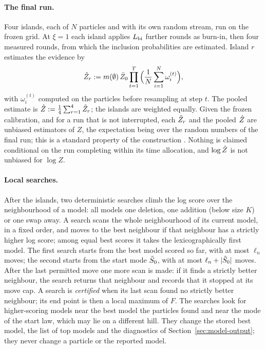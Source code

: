 \paragraph{The final run.} Four islands, each of $N$ particles and with its own random stream, run on the frozen
grid. At $\xi=1$ each island applies $L_{\mathrm{bi}}$ further rounds as burn-in, then four measured rounds, from which the
inclusion probabilities are estimated. Island $r$ estimates the evidence by
\begin{equation}\label{eq:zhat}
  \hat Z_r:=m(\emptyset)\,\bar Z_0\prod_{t=1}^{T}\Big(\frac1N\sum_{i=1}^N\omega^{(t)}_i\Big),
\end{equation}
with $\omega^{(t)}_i$ computed on the particles before resampling at step $t$. The pooled estimate is
$\hat Z:=\frac14\sum_{r=1}^4\hat Z_r$; the islands are weighted equally. Given the frozen calibration, and for a
run that is not interrupted, each $\hat Z_r$ and the pooled $\hat Z$ are unbiased estimators of $Z$, the expectation
being over the random numbers of the final run; this is a standard property of the construction
\citep{DelMoral2004}. Nothing is claimed conditional on the run completing within its time allocation, and
$\log\hat Z$ is not unbiased for $\log Z$.

\paragraph{Local searches.} After the islands, two deterministic searches climb the log score over the neighbourhood
of a model: all models one deletion, one addition (below size $K$) or one swap away. A search scans the whole
neighbourhood of its current model, in a fixed order, and moves to the best neighbour if that neighbour has a strictly
higher log score; among equal best scores it takes the lexicographically first model. The first search starts from
the best model scored so far, with at most $\ell_n$ moves; the second starts from the start mode $\tilde S_0$, with at most
$\ell_n+\lvert \tilde S_0\rvert$ moves. After the last permitted move one more scan is made: if it finds a strictly better
neighbour, the search returns that neighbour and records that it stopped at its move cap. A search is
\emph{certified} when its last scan found no strictly better neighbour; its end point is then a local maximum of $F$.
The searches look for higher-scoring models near the best model the particles found and near the mode of the start
law, which may lie on a different hill. They change the stored best model, the list of top models and the diagnostics
of Section~\ref{sec:model-output}; they never change a particle or the reported model.

